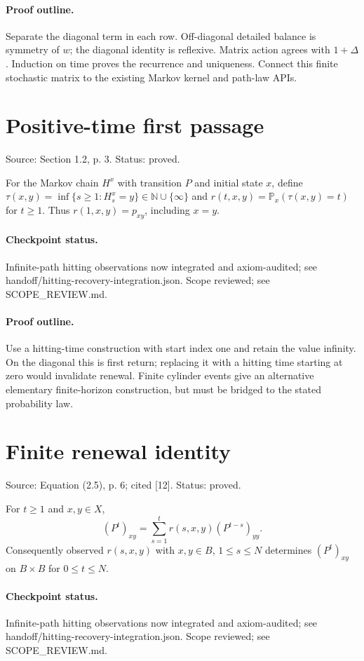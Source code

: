 \paragraph{Proof outline.}

Separate the diagonal term in each row. Off-diagonal detailed balance is symmetry of $w$; the diagonal identity is reflexive. Matrix action agrees with $1+\Delta$. Induction on time proves the recurrence and uniqueness. Connect this finite stochastic matrix to the existing Markov kernel and path-law APIs.
\nodebreak
\section{Positive-time first passage}
Source: Section 1.2, p. 3. Status: proved.
\begin{definition}\label{first-passage}

For the Markov chain $H^x$ with transition $P$ and initial state $x$, define $\tau(x,y)=\inf\{s\geq1:H_s^x=y\}\in\mathbb N\cup\{\infty\}$ and $r(t,x,y)=\mathbb P_x(\tau(x,y)=t)$ for $t\geq1$. Thus $r(1,x,y)=p_{xy}$, including $x=y$.


\paragraph{Checkpoint status.}
Infinite-path hitting observations now integrated and axiom-audited; see handoff/hitting-recovery-integration.json. Scope reviewed; see SCOPE\_REVIEW.md.
\end{definition}
\paragraph{Proof outline.}

Use a hitting-time construction with start index one and retain the value infinity. On the diagonal this is first return; replacing it with a hitting time starting at zero would invalidate renewal. Finite cylinder events give an alternative elementary finite-horizon construction, but must be bridged to the stated probability law.
\nodebreak
\section{Finite renewal identity}
Source: Equation (2.5), p. 6; cited [12]. Status: proved.
\begin{lemma}\label{renewal}

For $t\geq1$ and $x,y\in X$, \[(P^t)_{xy}=\sum_{s=1}^t r(s,x,y)(P^{t-s})_{yy}.\] Consequently observed $r(s,x,y)$ with $x,y\in B$, $1\leq s\leq N$ determines $(P^t)_{xy}$ on $B\times B$ for $0\leq t\leq N$.


\paragraph{Checkpoint status.}
Infinite-path hitting observations now integrated and axiom-audited; see handoff/hitting-recovery-integration.json. Scope reviewed; see SCOPE\_REVIEW.md.
\end{lemma}
